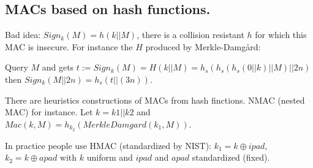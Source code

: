 \documentclass{article}
\begin{document}
\subsection{MACs based on hash functions.}
Bad idea: $Sign_k(M)=h(k||M)$, there is a collision resistant $h$ for which this MAC is insecure. For instance the $H$ produced by Merkle-Damg\aa rd:

Query $M$ and gets $t:=Sign_k(M)=H(k||M)=h_s(h_s(h_s(0||k)||M)||2n)$ then $Sign_k(M||2n)=h_s(t||(3n))$. 

There are heuristics constructions of MACs from hash finctions. NMAC (nested MAC) for instance. Let $k=k1||k2$ and $Mac(k,M)=h_{k_2}(MerkleDamgard(k_1,M))$. 

In practice people use HMAC (standardized by NIST): $k_1=k\oplus ipad$, $k_2=k\oplus apad$ with $k$ uniform and $ipad$ and $apad$ standardized (fixed). 
\end{document}
